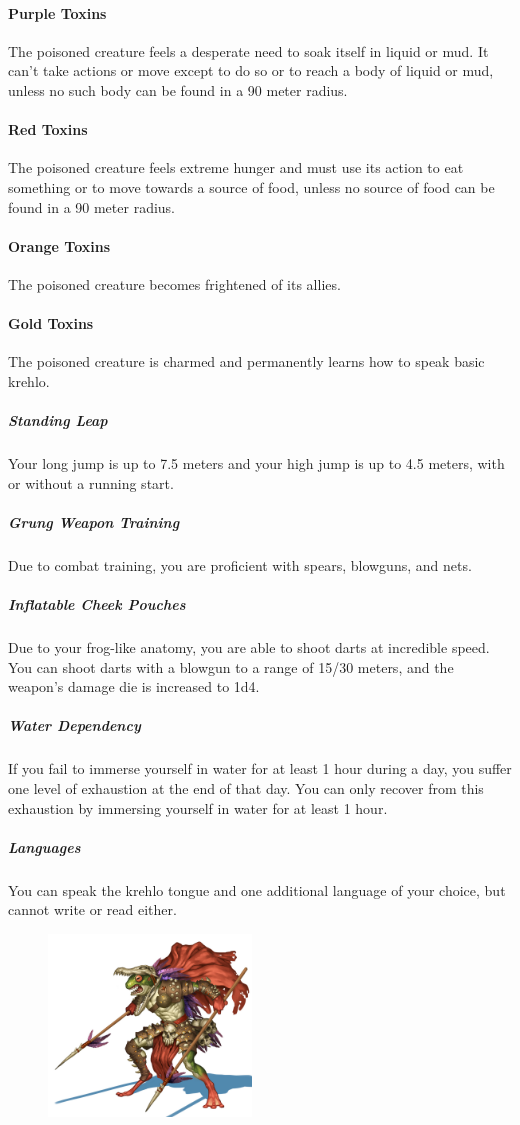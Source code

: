 \begin{linenumbers}
\paragraph{Purple Toxins} The poisoned creature feels a desperate need to soak itself in liquid or mud.
It can't take actions or move except to do so or to reach a body of liquid or mud, unless no such body can be found in a 90 meter radius.
\paragraph{Red Toxins} The poisoned creature feels extreme hunger and must use its action to eat something or to move towards a source of food, unless no source of food can be found in a 90 meter radius.
\paragraph{Orange Toxins} The poisoned creature becomes frightened of its allies.
\paragraph{Gold Toxins} The poisoned creature is charmed and permanently learns how to speak basic krehlo.

\subparagraph{Standing Leap} Your long jump is up to 7.5 meters and your high jump is up to 4.5 meters, with or without a running start.
\subparagraph{Grung Weapon Training} Due to combat training, you are proficient with spears, blowguns, and nets.
\subparagraph{Inflatable Cheek Pouches} Due to your frog-like anatomy, you are able to shoot darts at incredible speed.
You can shoot darts with a blowgun to a range of 15/30 meters, and the weapon's damage die is increased to 1d4.
\subparagraph{Water Dependency} If you fail to immerse yourself in water for at least 1 hour during a day, you suffer one level of exhaustion at the end of that day.
You can only recover from this exhaustion by immersing yourself in water for at least 1 hour.
\subparagraph{Languages} You can speak the krehlo tongue and one additional language of your choice, but cannot write or read either.

\begin{figure}[!b]
    \centering
    \includegraphics[width=0.48\textwidth]{02kins/img/18grung_warrior.jpg}
\end{figure}
\end{linenumbers}
